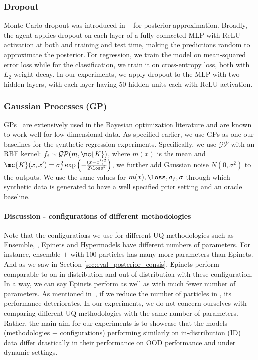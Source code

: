\subsubsection{Dropout}

Monte Carlo dropout was introduced in ~\citep{GalGh16} for posterior approximation. Broadly, the agent applies  dropout on each layer of a fully connected MLP with ReLU activation at both and training and test time, making the predictions random to approximate the posterior. For regression, we train the model on mean-squared error loss while for the classification, we train it on cross-entropy loss, both with $L_2$ weight decay. In our experiments, we apply dropout to the  MLP with two hidden layers, with each layer having 50 hidden units each with ReLU activation.





  \subsubsection{Gaussian Processes (GP)}
GPs~\citep{Rasmussen03} are extensively used in the Bayesian optimization literature and are known to work well for low dimensional data. 
As specified earlier, we use GPs as one our baselines for the synthetic regression experiments. Specifically, we use $\mathcal{GP}$ with an RBF kernel: $f_i \sim \mathcal{GP}(m,\mc{K}) $, where $m(x)$ is the mean and $\mc{K}(x,x') = \sigma_f^2 \exp\left(-\frac{(x-x')^2}{2\loss^2}\right)$,  we further add Gaussian   noise $N(0,\sigma^2)$ to the outputs. We use the same values for $m(x), \loss, \sigma_f, \sigma$ through which synthetic data is generated to have a well specified prior setting and an oracle baseline. 



\paragraph{Discussion - configurations of different methodologies} Note that the configurations we use for different UQ methodologies such as Ensemble, \ensembleplus, Epinets and Hypermodels have different numbers of parameters. 
For instance, ensemble $+$ with 100 particles has many more parameters than Epinets. And as we saw in Section \ref{sec:eval_posterior_consis}, Epinets perform comparable to   \ensembleplus on in-distribution and out-of-distribution with these configuration. In a way, we can say Epinets perform as well as \ensembleplus with much fewer number of parameters. As mentioned in~\citep{OsbandWeAsDwLuIbLaHaDoRo22, OsbandWenAsDwIbLuRo23}, if we reduce the number of particles in \ensembleplus, its performance deteriorates. 
In our experiments, we do not concern ourselves with comparing different UQ methodologies with the same number of parameters. 
Rather, the main aim for our experiments is to showcase that the models (methodologies + configurations) performing similarly on in-distribution (ID) data  differ drastically in their performance on OOD performance and under dynamic settings. 

